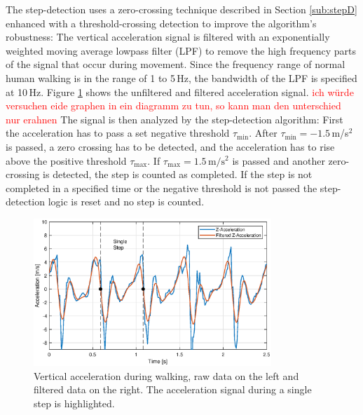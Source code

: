 \documentclass[engproc,conferenceproceedings,submit,pdftex,moreauthors]{Definitions/mdpi}
\begin{document}
 The step-detection uses a zero-crossing technique described in Section \ref{sub:stepD} enhanced with a threshold-crossing detection to improve the algorithm's robustness: The vertical acceleration signal is filtered with an exponentially weighted moving average lowpass filter (LPF) to remove the high frequency parts of the signal that occur during movement. Since the frequency range of normal human walking is in the range of 1 to 5\,Hz, the bandwidth of the LPF is specified at 10\,Hz. Figure \ref{fig:AccelWalk} shows the unfiltered and filtered acceleration signal. \textcolor{red}{ich würde versuchen eide graphen in ein diagramm zu tun, so kann man den unterschied nur erahnen} The signal is then analyzed by the step-detection algorithm: First the acceleration has to pass a set negative threshold $\tau_{\min}$. After $\tau_{\min} = -1.5$\,m/s$^2$ is passed, a zero crossing has to be detected, and the acceleration has to rise above the positive threshold $\tau_{\max}$. If $\tau_{\max} = 1.5\,\mathrm{m/s^2}$ is passed and another zero-crossing is detected, the step is counted as completed. If the step is not completed in a specified time or the negative threshold is not passed the step-detection logic is reset and no step is counted. 
\begin{figure}[h!]
	\centering
	\includegraphics[width=0.8\textwidth]{WalkAcceleration.eps}
	\caption{Vertical acceleration during walking, raw data on the left and filtered data on the right. The acceleration signal during a single step is highlighted.}
	\label{fig:AccelWalk}
\end{figure}


%	
\end{document}
